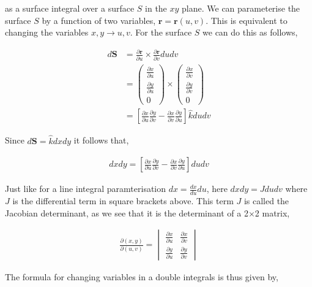 \documentclass[11pt]{amsart}
\begin{document}
as a surface integral over a surface $S$ in the $xy$ plane. We can parameterise the surface $S$ by a function of two variables, $\mathbf{r} = \mathbf{r}(u, v)$. This is equivalent to changing the variables $x, y \to u, v$. For the surface $S$ we can do this as follows,

\begin{align*}
  d\mathbf{S} &= \frac{\partial \mathbf{r}}{\partial u} \times \frac{\partial \mathbf{r}}{\partial v} du dv \\
              &=
  \begin{pmatrix}
    \frac{\partial x}{\partial u} \\[4pt]
    \frac{\partial y}{\partial u} \\[4pt]
    0
  \end{pmatrix} \times
  \begin{pmatrix}
    \frac{\partial x}{\partial v} \\[4pt]
    \frac{\partial y}{\partial v} \\[4pt]
    0
  \end{pmatrix} \\
  &= \left[ \frac{\partial x}{\partial u} \frac{\partial y}{\partial v} - \frac{\partial x}{\partial v} \frac{\partial y}{\partial u} \right] \hat{k} du dv
\end{align*}

Since $d\mathbf{S} = \hat{k} dx dy$ it follows that,

\begin{align*}
  dx dy = \left[ \frac{\partial x}{\partial u} \frac{\partial y}{\partial v} - \frac{\partial x}{\partial v} \frac{\partial y}{\partial u} \right] du dv
\end{align*}

Just like for a line integral paramterisation $dx = \frac{dx}{du} du$, here $dx dy = J du dv$ where $J$ is the differential term in square brackets above. This term $J$ is called the Jacobian determinant, as we see that it is the determinant of a 2$\times$2 matrix,

\begin{align*}
  \frac{\partial(x, y)}{\partial(u, v)} =
  \begin{vmatrix}
    \frac{\partial x}{\partial u} & \frac{\partial x}{\partial v} \\[4pt]
    \frac{\partial y}{\partial u} & \frac{\partial y}{\partial v}
  \end{vmatrix}
\end{align*}

The formula for changing variables in a double integrals is thus given by,
\end{document}
